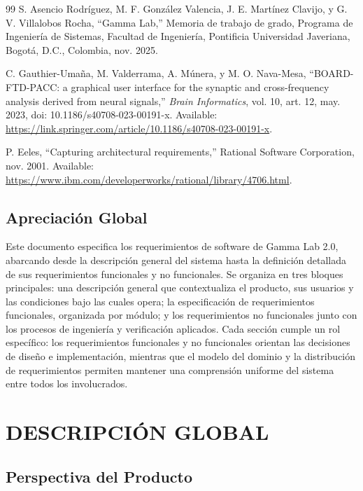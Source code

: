 \documentclass[12pt, letterpaper]{article}
\begin{document}
\begin{thebibliography}{99}
S. Asencio Rodríguez, M. F. González Valencia, J. E. Martínez Clavijo, y G. V. Villalobos Rocha, ``Gamma Lab,'' Memoria de trabajo de grado, Programa de Ingeniería de Sistemas, Facultad de Ingeniería, Pontificia Universidad Javeriana, Bogotá, D.C., Colombia, nov. 2025.

C. Gauthier-Umaña, M. Valderrama, A. Múnera, y M. O. Nava-Mesa, ``BOARD-FTD-PACC: a graphical user interface for the synaptic and cross-frequency analysis derived from neural signals,'' \textit{Brain Informatics}, vol. 10, art. 12, may. 2023, doi: 10.1186/s40708-023-00191-x. Available: \url{https://link.springer.com/article/10.1186/s40708-023-00191-x}.

P. Eeles, ``Capturing architectural requirements,'' Rational Software Corporation, nov. 2001. Available: \url{https://www.ibm.com/developerworks/rational/library/4706.html}.

\end{thebibliography}
\subsection{Apreciación Global}

Este documento especifica los requerimientos de software de Gamma Lab 2.0, abarcando desde la descripción general del sistema hasta la definición detallada de sus requerimientos funcionales y no funcionales. Se organiza en tres bloques principales: una descripción general que contextualiza el producto, sus usuarios y las condiciones bajo las cuales opera; la especificación de requerimientos funcionales, organizada por módulo; y los requerimientos no funcionales junto con los procesos de ingeniería y verificación aplicados. Cada sección cumple un rol específico: los requerimientos funcionales y no funcionales orientan las decisiones de diseño e implementación, mientras que el modelo del dominio y la distribución de requerimientos permiten mantener una comprensión uniforme del sistema entre todos los involucrados.

\newpage



\newpage

\section{DESCRIPCIÓN GLOBAL}

\subsection{Perspectiva del Producto}
\end{document}
